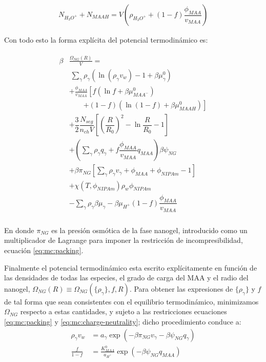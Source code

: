 	\begin{align}
		N_{H_3O^+}+N_{MAAH}=V\left(\rho_{H_3O^+}+(1-f)\dfrac{\phi_{MAA}}{v_{MAA}}\right)
		\label{eq:mc:equilibrio}
	\end{align}
	
	
	
	Con todo esto la forma expl\'icita del potencial termodin\'amico es:
	
	
	
	
	\begin{align}
		\begin{aligned}
			\beta&\frac{\Omega_{NG}(R)}{V}=\\& ~ \sum_{\gamma} \rho_\gamma\left(\ln\left(\rho_\gamma v_w\right) -1 + \beta\mu^0_\gamma\right) \\
			& + \frac{\phi_{MAA}}{v_{MAA}} \left[f(\ln f+ \beta\mu^0_{MAA^-})\right.\\
			&\qquad\left.+(1-f)(\ln (1-f)+\beta\mu^0_{MAAH})\right] \\
			& + \dfrac{3}{2}\dfrac{N_{seg}}{n_{ch} V}\left[\left(\dfrac{R}{R_0}\right)^2 - \ln\dfrac{R}{R_0} -1\right] \\
			& +  \left(\sum_{\gamma } {\rho_\gamma q_\gamma + f\dfrac{\phi_{MAA}}{v_{MAA}}q_{MAA}}\right)\beta\psi_{NG}\\
			& +\beta\pi_{NG} \left[ \sum_{\gamma } \rho_\gamma v_\gamma  + \phi_{MAA} + \phi_{NIPAm} -1 \right] \\
			& + \chi (T, \phi_{NIPAm})\rho_w \phi_{NIPAm} \\
			& -\sum_{\gamma }{\rho_\gamma\beta\mu_\gamma}
			-\beta\mu_{H^+}(1-f)\dfrac{\phi_{MAA}}{v_{MAA}}\\
		\end{aligned}
		\label{eq:mc:free-energy}
	\end{align}
	
	
	
	
	\noindent En donde $\pi_{NG}$ es la presi\'on osm\'otica de la fase nanogel, introducido como un multiplicador de Lagrange para imponer la restricci\'on de incompresibilidad, ecuaci\'on \ref{eq:mc:packing}.
	
	
	Finalmente el potencial termodin\'amico esta escrito expl\'icitamente en funci\'on de las densidades de todas las especies, el grado de carga del MAA y el radio del nanogel, $\Omega_{NG}(R)\equiv\Omega_{NG}(\{\rho_\gamma\},f,R)$.
	Para obtener las expresiones de $\{\rho_\gamma\}$ y $f$ de tal forma que sean consistentes con el equilibrio termodin\'amico, minimizamos $\Omega_{NG}$ respecto a estas cantidades, y  sujeto a las restricciones ecuaciones  \ref{eq:mc:packing} y  \ref{eq:mc:charge-neutrality}; dicho procedimiento conduce a: 
	\begin{align}
		\rho_\gamma v_w &= a_\gamma \exp(-\beta\pi_{NG}v_\gamma -\beta\psi_{NG}q_{\gamma})\\
		\frac{f}{1-f}&= \frac{K^0_{MAA}}{a_{H^+}}\exp(-\beta\psi_{NG}q_{MAA})\label{eq:mc:fcharge}
	\end{align}
	
